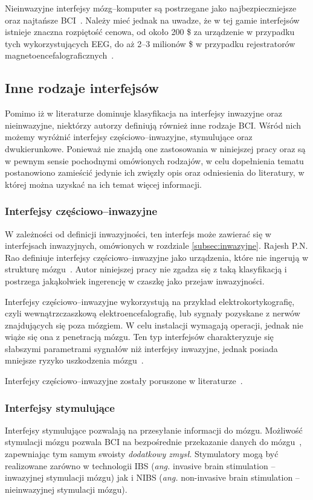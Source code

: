 \documentclass[skorowidz,skroty]{dyplomWEZUT}
\begin{document}
Nieinwazyjne interfejsy mózg--komputer są postrzegane jako najbezpieczniejsze oraz najtańsze BCI~\cite{bci_trends}. Należy mieć jednak na uwadze, że w tej gamie interfejsów istnieje znaczna rozpiętość cenowa, od około 200 \$ za urządzenie w przypadku tych wykorzystujących EEG, do aż 2--3 milionów \$ w przypadku rejestratorów magnetoencefalograficznych~\cite{bci_neuroimaging}.


\subsection{Inne rodzaje interfejsów}
Pomimo iż w literaturze dominuje klasyfikacja na interfejsy inwazyjne oraz nieinwazyjne, niektórzy autorzy definiują również inne rodzaje BCI. Wśród nich możemy wyróżnić interfejsy częściowo--inwazyjne, stymulujące oraz dwukierunkowe. Ponieważ nie znajdą one zastosowania w niniejszej pracy oraz są w pewnym sensie pochodnymi omówionych rodzajów, w celu dopełnienia tematu postanowiono zamieścić jedynie ich zwięzły opis oraz odniesienia do literatury, w której można uzyskać na ich temat więcej informacji.

\subsubsection{Interfejsy częściowo--inwazyjne}
W zależności od definicji inwazyjności, ten interfejs może zawierać się w interfejsach inwazyjnych, omówionych w rozdziale \vref{subsec:inwazyjne}. Rajesh P.N. Rao definiuje interfejsy częściowo--inwazyjne jako urządzenia, które nie ingerują w strukturę mózgu~\cite{bci_introduction}. Autor niniejszej pracy nie zgadza się z taką klasyfikacją i postrzega jakąkolwiek ingerencję w czaszkę jako przejaw inwazyjności.

Interfejsy częściowo--inwazyjne wykorzystują na przykład elektrokortykografię, czyli wewnątrzczaszkową elektroencefalografię, lub sygnały pozyskane z nerwów znajdujących się poza mózgiem. W celu instalacji wymagają operacji, jednak nie wiąże się ona z penetracją mózgu. Ten typ interfejsów charakteryzuje się słabszymi parametrami sygnałów niż interfejsy inwazyjne, jednak posiada mniejsze ryzyko uszkodzenia mózgu~\cite{bci_trends}.

Interfejsy częściowo--inwazyjne zostały poruszone w literaturze~\cite{bci_introduction,bci_trends,bci_revolutionizing}.

\subsubsection{Interfejsy stymulujące}
Interfejsy stymulujące pozwalają na przesyłanie informacji do mózgu. Możliwość stymulacji mózgu pozwala BCI na bezpośrednie przekazanie danych do mózgu~\cite{bci_introduction}, zapewniając tym samym swoisty \textit{dodatkowy zmysł}. Stymulatory mogą być realizowane zarówno w technologii IBS (\textit{ang.} invasive brain stimulation -- inwazyjnej stymulacji mózgu) jak i NIBS (\textit{ang.} non-invasive brain stimulation -- nieinwazyjnej stymulacji mózgu).
\end{document}
